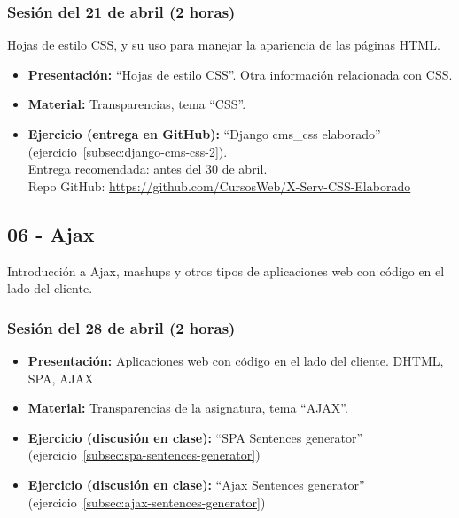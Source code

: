 \documentclass[a4paper,12pt]{article}
\begin{document}
\subsubsection{Sesión del 21 de abril (2 horas)}

Hojas de estilo CSS, y su uso para manejar la apariencia de las páginas HTML.

\begin{itemize}
\item \textbf{Presentación:} ``Hojas de estilo CSS''. Otra información relacionada con CSS.
 \item \textbf{Material:} Transparencias, tema ``CSS''.
\item \textbf{Ejercicio (entrega en GitHub):} ``Django cms\_css elaborado'' (ejercicio~\ref{subsec:django-cms-css-2}). \\
  Entrega recomendada: antes del 30 de abril. \\
  Repo GitHub: \url{https://github.com/CursosWeb/X-Serv-CSS-Elaborado}
\end{itemize}


\subsection{06 - Ajax}

Introducción a Ajax, mashups y otros tipos de aplicaciones web con código en el lado del cliente.

\subsubsection{Sesión del 28 de abril (2 horas)}


\begin{itemize}
\item \textbf{Presentación:} Aplicaciones web con código en el lado del cliente. DHTML, SPA, AJAX
\item \textbf{Material:} Transparencias de la asignatura, tema ``AJAX''.
\item \textbf{Ejercicio (discusión en clase):} ``SPA Sentences generator'' (ejercicio~\ref{subsec:spa-sentences-generator})
\item \textbf{Ejercicio (discusión en clase):} ``Ajax Sentences generator'' (ejercicio~\ref{subsec:ajax-sentences-generator})
\end{itemize}
\end{document}
